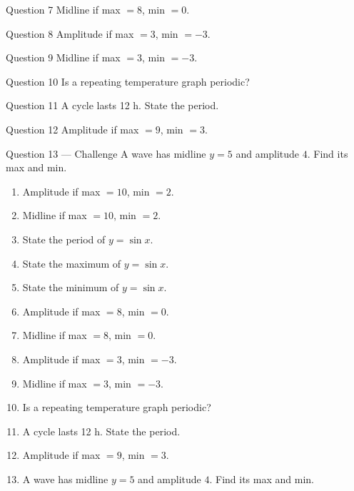 \documentclass[11pt]{article}
\begin{document}
\begin{qbox}{Question 7}
Midline if max $=8$, min $=0$.\workspace{2.4cm}
\end{qbox}

\begin{qbox}{Question 8}
Amplitude if max $=3$, min $=-3$.\workspace{2.4cm}
\end{qbox}

\begin{qbox}{Question 9}
Midline if max $=3$, min $=-3$.\workspace{2.4cm}
\end{qbox}

\begin{qbox}{Question 10}
Is a repeating temperature graph periodic?\workspace{2.4cm}
\end{qbox}

\begin{qbox}{Question 11}
A cycle lasts 12 h. State the period.\workspace{2.4cm}
\end{qbox}

\begin{qbox}{Question 12}
Amplitude if max $=9$, min $=3$.\workspace{2.4cm}
\end{qbox}

\begin{qbox}{Question 13 --- Challenge}
A wave has midline $y=5$ and amplitude $4$. Find its max and min.\workspace{2.6cm}
\end{qbox}

\clearpage
{}

\begin{recapbox}
\begin{multicols}{2}
\small
\begin{enumerate}[leftmargin=*,itemsep=3pt]
  \item Amplitude if max $=10$, min $=2$.
  \item Midline if max $=10$, min $=2$.
  \item State the period of $y=\sin x$.
  \item State the maximum of $y=\sin x$.
  \item State the minimum of $y=\sin x$.
  \item Amplitude if max $=8$, min $=0$.
  \item Midline if max $=8$, min $=0$.
  \item Amplitude if max $=3$, min $=-3$.
  \item Midline if max $=3$, min $=-3$.
  \item Is a repeating temperature graph periodic?
  \item A cycle lasts 12 h. State the period.
  \item Amplitude if max $=9$, min $=3$.
  \item A wave has midline $y=5$ and amplitude $4$. Find its max and min.
\end{enumerate}
\end{multicols}
\end{recapbox}
\end{document}
